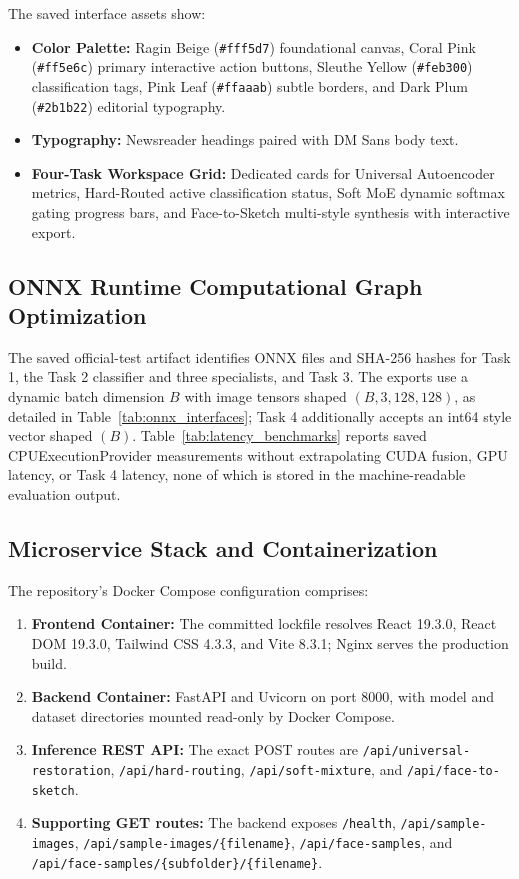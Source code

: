 \documentclass[journal,compsoc]{IEEEtran}
\begin{document}
The saved interface assets show:
\begin{itemize}
    \item \textbf{Color Palette:} Ragin Beige (\texttt{\#fff5d7}) foundational canvas, Coral Pink (\texttt{\#ff5e6c}) primary interactive action buttons, Sleuthe Yellow (\texttt{\#feb300}) classification tags, Pink Leaf (\texttt{\#ffaaab}) subtle borders, and Dark Plum (\texttt{\#2b1b22}) editorial typography.
    \item \textbf{Typography:} Newsreader headings paired with DM Sans body text.
    \item \textbf{Four-Task Workspace Grid:} Dedicated cards for Universal Autoencoder metrics, Hard-Routed active classification status, Soft MoE dynamic softmax gating progress bars, and Face-to-Sketch multi-style synthesis with interactive export.
\end{itemize}

\subsection{ONNX Runtime Computational Graph Optimization}
The saved official-test artifact identifies ONNX files and SHA-256 hashes for Task 1, the Task 2 classifier and three specialists, and Task 3. The exports use a dynamic batch dimension $B$ with image tensors shaped $(B,3,128,128)$, as detailed in Table~\ref{tab:onnx_interfaces}; Task 4 additionally accepts an int64 style vector shaped $(B)$. Table~\ref{tab:latency_benchmarks} reports saved CPUExecutionProvider measurements without extrapolating CUDA fusion, GPU latency, or Task 4 latency, none of which is stored in the machine-readable evaluation output.

\subsection{Microservice Stack and Containerization}
The repository's Docker Compose configuration comprises:
\begin{enumerate}
    \item \textbf{Frontend Container:} The committed lockfile resolves React 19.3.0, React DOM 19.3.0, Tailwind CSS 4.3.3, and Vite 8.3.1; Nginx serves the production build.
    \item \textbf{Backend Container:} FastAPI and Uvicorn on port 8000, with model and dataset directories mounted read-only by Docker Compose.
    \item \textbf{Inference REST API:} The exact POST routes are \texttt{/api/universal-restoration}, \texttt{/api/hard-routing}, \texttt{/api/soft-mixture}, and \texttt{/api/face-to-sketch}.
    \item \textbf{Supporting GET routes:} The backend exposes \texttt{/health}, \texttt{/api/sample-images}, \texttt{/api/sample-images/\{filename\}}, \texttt{/api/face-samples}, and \texttt{/api/face-samples/\{subfolder\}/\{filename\}}.
\end{enumerate}
\end{document}
